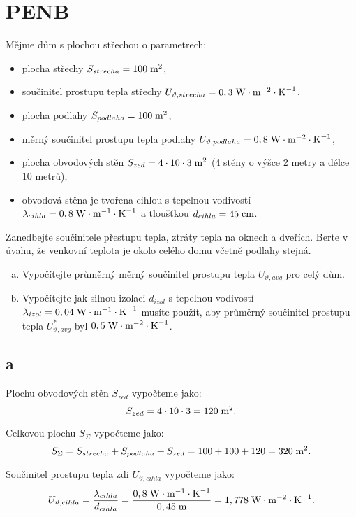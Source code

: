 \documentclass{article}
\begin{document}
\section{ PENB \spicy \spicy}
Mějme dům s plochou střechou o parametrech:
\begin{itemize}
    \item plocha střechy $S_{strecha} = 100 \; \textrm{m}^{\textrm{2}}$,
    \item součinitel prostupu tepla střechy $U_{\vartheta,strecha} = 0,3 \; \textrm{W} \cdot \textrm{m}^{-2} \cdot \textrm{K}^{-1}$,
    \item plocha podlahy $S_{podlaha} = 100 \; \textrm{m}^{\textrm{2}}$,
    \item měrný součinitel prostupu tepla podlahy $U_{\vartheta,podlaha} = 0,8 \; \textrm{W} \cdot \textrm{m}^{-2} \cdot \textrm{K}^{-1}$,
    \item plocha obvodových stěn $S_{zed} = 4 \cdot 10 \cdot 3 \; \textrm{m}^{\textrm{2}}$ (4 stěny o výšce 2 metry a délce 10 metrů),
    \item obvodová stěna je tvořena cihlou s tepelnou vodivostí $\lambda_{cihla} = 0,8 \; \textrm{W} \cdot \textrm{m}^{-1} \cdot \textrm{K}^{-1}$ a tloušťkou $d_{cihla} = 45 \; \textrm{cm}$.
\end{itemize}

Zanedbejte součinitele přestupu tepla, ztráty tepla na oknech a dveřích. Berte v úvahu, že venkovní teplota je okolo celého domu včetně podlahy stejná.
\begin{enumerate}[a)]
    \item Vypočítejte průměrný měrný součinitel prostupu tepla $U_{\vartheta,avg}$ pro celý dům.
    \item Vypočítejte jak silnou izolaci $d_{izol}$ s tepelnou vodivostí $\lambda_{izol} = 0,04 \; \textrm{W} \cdot \textrm{m}^{-1} \cdot \textrm{K}^{-1}$ musíte použít, aby průměrný součinitel prostupu tepla $U_{\vartheta,avg}^{*}$ byl $0,5 \; \textrm{W} \cdot \textrm{m}^{-2} \cdot \textrm{K}^{-1}$.
\end{enumerate}



\subsection{a}
Plochu obvodových stěn $S_{zed}$ vypočteme jako:
$$
    S_{zed} = 4 \cdot 10 \cdot 3 = 120 \; \textrm{m}^{\textrm{2}}.
$$

Celkovou plochu $S_{\Sigma}$ vypočteme jako:
$$
    S_{\Sigma} = S_{strecha} + S_{podlaha} + S_{zed} = 100 + 100 + 120 = 320 \; \textrm{m}^{\textrm{2}}.
$$

Součinitel prostupu tepla zdi $U_{\vartheta,cihla}$ vypočteme jako:
$$
    U_{\vartheta,cihla} = \frac{\lambda_{cihla}}{d_{cihla}} = \frac{0,8 \; \textrm{W} \cdot \textrm{m}^{-1} \cdot \textrm{K}^{-1}}{0,45 \; \textrm{m}} = 1,778 \; \textrm{W} \cdot \textrm{m}^{-2} \cdot \textrm{K}^{-1}.
$$
\end{document}

